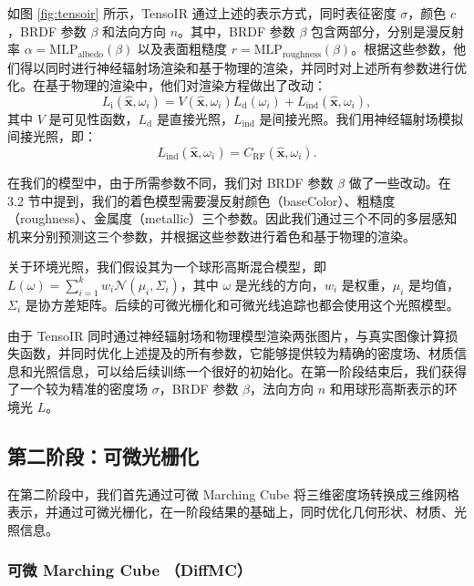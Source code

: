 如图 \ref{fig:tensoir} 所示，TensoIR 通过上述的表示方式，同时表征密度 $\sigma$，颜色 $c$，BRDF 参数 $\beta$ 和法向方向 $n$。其中，BRDF 参数 $\beta$ 包含两部分，分别是漫反射率 $\alpha = \mathrm{MLP}_{\mathrm{albedo}}(\beta)$ 以及表面粗糙度 $r=\mathrm{MLP}_{\mathrm{roughness}}(\beta)$。根据这些参数，他们得以同时进行神经辐射场渲染和基于物理的渲染，并同时对上述所有参数进行优化。在基于物理的渲染中，他们对渲染方程做出了改动：
\begin{equation}
  L_{\mathrm{i}}(\mathbf{\hat{x}},\omega_{i})=V(\mathbf{\hat{x}},\omega_{i})L_{\mathrm{d}}(\omega_{i})+L_{\mathrm{ind}}(\mathbf{\hat{x}},\omega_{i}),
\end{equation}
其中 $V$ 是可见性函数，$L_{\mathrm{d}}$ 是直接光照，$L_{\mathrm{ind}}$ 是间接光照。我们用神经辐射场模拟间接光照，即：
\begin{equation}
  L_{\mathrm{ind}}(\mathbf{\hat{x}},\omega_i)=C_{\mathrm{RF}}(\mathbf{\hat{x}},\omega_i).
\end{equation}

在我们的模型中，由于所需参数不同，我们对 BRDF 参数 $\beta$ 做了一些改动。在 3.2 节中提到，我们的着色模型需要漫反射颜色（baseColor）、粗糙度（roughness）、金属度（metallic）三个参数。因此我们通过三个不同的多层感知机来分别预测这三个参数，并根据这些参数进行着色和基于物理的渲染。

关于环境光照，我们假设其为一个球形高斯混合模型，即 $L(\omega) = \sum_{i=1}^k w_i \mathcal{N}(\mu_i, \Sigma_i)$，其中 $\omega$ 是光线的方向，$w_i$ 是权重，$\mu_i$ 是均值，$\Sigma_i$ 是协方差矩阵。后续的可微光栅化和可微光线追踪也都会使用这个光照模型。

由于 TensoIR 同时通过神经辐射场和物理模型渲染两张图片，与真实图像计算损失函数，并同时优化上述提及的所有参数，它能够提供较为精确的密度场、材质信息和光照信息，可以给后续训练一个很好的初始化。在第一阶段结束后，我们获得了一个较为精准的密度场 $\sigma$，BRDF 参数 $\beta$，法向方向 $n$ 和用球形高斯表示的环境光 $L$。

\subsection{第二阶段：可微光栅化}

在第二阶段中，我们首先通过可微 Marching Cube 将三维密度场转换成三维网格表示，并通过可微光栅化，在一阶段结果的基础上，同时优化几何形状、材质、光照信息。

\subsubsection{可微 Marching Cube （DiffMC） \cite{wei2023neumanifold}}

